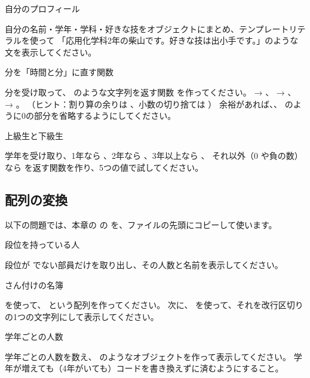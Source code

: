 \begin{exercise}[1]{自分のプロフィール}
\toanswer\par
自分の名前・学年・学科・好きな技をオブジェクトにまとめ、テンプレートリテラルを使って
「応用化学科2年の柴山です。好きな技は出小手です。」のような文を表示してください。
\end{exercise}

\begin{exercise}[2]{分を「時間と分」に直す関数}
\toanswer\par
分を受け取って、 のような文字列を返す関数  を作ってください。
 → 、 → 、 → 。
（ヒント：割り算の余りは \code{\%}、小数の切り捨ては ）
余裕があれば、、 のように0の部分を省略するようにしてください。
\end{exercise}

\begin{exercise}[2]{上級生と下級生}
\toanswer\par
学年を受け取り、1年なら 、2年なら 、3年以上なら 、
それ以外（0 や負の数）なら  を返す関数を作り、5つの値で試してください。
\end{exercise}

\subsection*{配列の変換}

以下の問題では、本章の  の  を、ファイルの先頭にコピーして使います。

\begin{exercise}[2]{段位を持っている人}
\toanswer\par
段位が  でない部員だけを取り出し、その人数と名前を表示してください。
\end{exercise}

\begin{exercise}[2]{さん付けの名簿}
\toanswer\par
{} を使って、 という配列を作ってください。
次に、 を使って、それを改行区切りの1つの文字列にして表示してください。
\end{exercise}

\begin{exercise}[3]{学年ごとの人数}
\toanswer\par
学年ごとの人数を数え、 のようなオブジェクトを作って表示してください。
学年が増えても（4年がいても）コードを書き換えずに済むようにすること。
\end{exercise}

